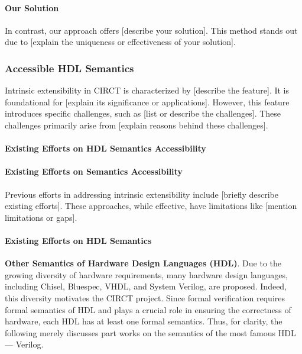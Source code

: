 \paragraph{Our Solution}
\ToWrite{}
In contrast, our approach offers [describe your solution]. This method stands out due to [explain the uniqueness or effectiveness of your solution].


\subsubsection{Accessible HDL Semantics}
Intrinsic extensibility in CIRCT is characterized by [describe the feature]. It is foundational for [explain its significance or applications].
However, this feature introduces specific challenges, such as [list or describe the challenges]. These challenges primarily arise from [explain reasons behind these challenges].

\paragraph{Existing Efforts on HDL Semantics Accessibility}

\paragraph{Existing Efforts on Semantics Accessibility}
\ToWrite{}
Previous efforts in addressing intrinsic extensibility include [briefly describe existing efforts]. These approaches, while effective, have limitations like [mention limitations or gaps]. 


\paragraph{Existing Efforts on HDL Semantics}
 \textbf{Other Semantics of Hardware Design Languages (HDL)}. Due to the growing diversity of hardware requirements, many hardware design languages, including Chisel, Bluespec, VHDL, and System Verilog, are proposed. Indeed, this diversity motivates the CIRCT project. Since formal verification requires formal semantics of HDL and plays a crucial role in ensuring the correctness of hardware, each HDL has at least one formal semantics. Thus, for clarity, the following merely discusses part works on the semantics of the most famous HDL --- Verilog.

